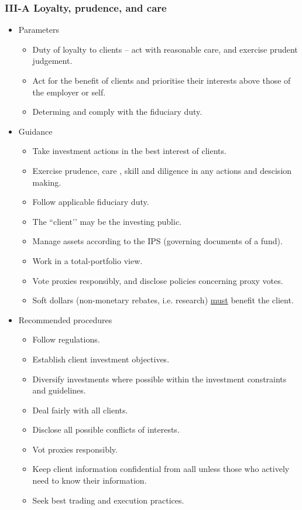 \documentclass[../notes_compiled.tex]{subfiles}
\begin{document}
\subsubsection{III-A Loyalty, prudence, and care}
\begin{itemize}
\item Parameters
\begin{itemize}
\item Duty of loyalty to clients -- act with reasonable care, and exercise prudent judgement.
\item Act for the benefit of clients and prioritise their interests above those of the employer or self.
\item Determing and comply with the fiduciary duty.
\end{itemize}
\item Guidance
\begin{itemize}
\item Take investment actions in the best interest of clients.
\item Exercise prudence, care , skill and diligence in any actions and descision making.
\item Follow applicable fiduciary duty.
\item The ``client’’ may be the investing public.
\item Manage assets according to the IPS (governing documents of a fund).
\item Work in a total-portfolio view.
\item Vote proxies responsibly, and disclose policies concerning proxy votes.
\item Soft dollars (non-monetary rebates, i.e. research) \underline{must} benefit the client.
\end{itemize}
\item Recommended procedures
\begin{itemize}
\item Follow regulations.
\item Establish client investment objectives.
\item Diversify investments where possible within the investment constraints and guidelines.
\item Deal fairly with all clients.
\item Disclose all possible conflicts of interests.
\item Vot proxies responsibly.
\item Keep client information confidential from aall unless those who actively need to know their information.
\item Seek best trading and execution practices.
\end{itemize}
\end{itemize}
\end{document}
